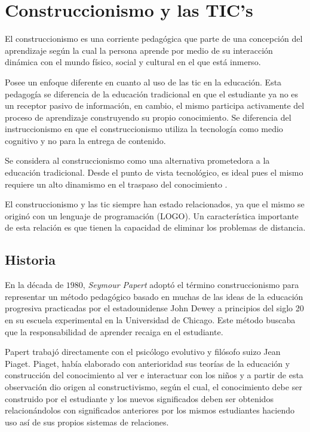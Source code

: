 \section{Construccionismo y las TIC's}
\label{sec:tics_CONSTRUCCIONISMO}

El construccionismo es una corriente pedagógica que parte de una concepción del 
aprendizaje según la cual la persona aprende por medio de su interacción dinámica 
con el mundo físico, social y cultural en el que está inmerso\cite{valdivia:sg}.

Posee un enfoque diferente en cuanto al uso de las
\Gls{tic} en la educación. Esta pedagogía se diferencia de la educación
tradicional en que el estudiante ya no es un receptor pasivo de información, en
cambio, el mismo participa activamente del proceso de aprendizaje construyendo
su propio conocimiento. Se diferencia del instruccionismo en que el construccionismo 
utiliza la tecnología como medio cognitivo y no para la entrega de contenido.

Se considera al construccionismo como una alternativa prometedora a la
educación tradicional. Desde el punto de vista tecnológico,
es ideal pues el mismo requiere un alto dinamismo en el traspaso del
conocimiento \cite{sasha:construtivism}. 

El construccionismo y las \Gls{tic} siempre han estado
relacionados, ya que el mismo se originó con un lenguaje de programación
(LOGO)\cite{ict:ttc}. Un característica importante de esta relación es que
tienen la capacidad de eliminar los problemas de
distancia\cite{mariluz:seiousgames}.


\subsection{Historia}

En la década de $1980$, \emph{Seymour Papert} adoptó el término construccionismo
para representar un método pedagógico basado en muchas de las ideas de la educación 
progresiva practicadas por el estadounidense John Dewey a principios del siglo 20 en 
su escuela experimental en la Universidad de Chicago. Este método buscaba que la 
responsabilidad de aprender recaiga en el estudiante\cite{historia:2014}. 

Papert trabajó directamente con el psicólogo evolutivo y filósofo suizo Jean
Piaget. Piaget, había elaborado con anterioridad sus teorías
de la educación y construcción del conocimiento al ver e interactuar con los
niños y a partir de esta observación dio origen al constructivismo, según el
cual, el conocimiento debe ser construido por el estudiante y los nuevos
significados deben ser obtenidos relacionándolos con significados anteriores por
los mismos estudiantes haciendo uso así de sus propios sistemas de relaciones\cite{historia:2014}.

